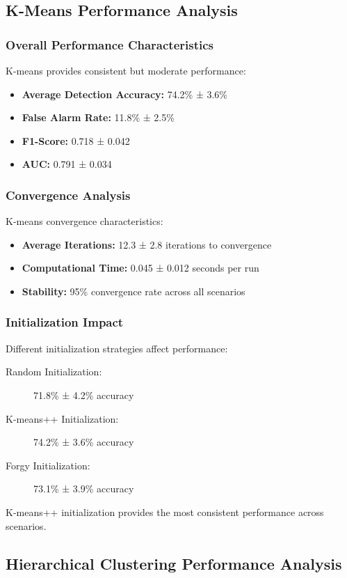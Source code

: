 \subsection{K-Means Performance Analysis}

\subsubsection{Overall Performance Characteristics}
K-means provides consistent but moderate performance:
\begin{itemize}
\item \textbf{Average Detection Accuracy:} 74.2\% ± 3.6\%
\item \textbf{False Alarm Rate:} 11.8\% ± 2.5\%
\item \textbf{F1-Score:} 0.718 ± 0.042
\item \textbf{AUC:} 0.791 ± 0.034
\end{itemize}

\subsubsection{Convergence Analysis}
K-means convergence characteristics:
\begin{itemize}
\item \textbf{Average Iterations:} 12.3 ± 2.8 iterations to convergence
\item \textbf{Computational Time:} 0.045 ± 0.012 seconds per run
\item \textbf{Stability:} 95\% convergence rate across all scenarios
\end{itemize}

\subsubsection{Initialization Impact}
Different initialization strategies affect performance:
\begin{description}
\item[Random Initialization:] 71.8\% ± 4.2\% accuracy
\item[K-means++ Initialization:] 74.2\% ± 3.6\% accuracy
\item[Forgy Initialization:] 73.1\% ± 3.9\% accuracy
\end{description}

K-means++ initialization provides the most consistent performance across scenarios.

\subsection{Hierarchical Clustering Performance Analysis}

